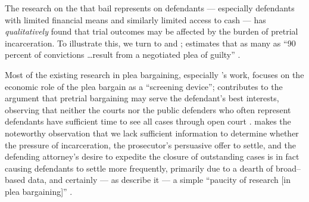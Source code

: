 The research on the  that bail represents on defendants
--- especially defendants with limited financial means and similarly limited access to cash ---
has \textit{qualitatively} found that
trial outcomes may be affected by the burden of pretrial incarceration.
To illustrate this, we turn to
\citet{grossman1983plea} and \citet{alschuler1981changing};
\citeauthor{grossman1983plea} estimates that as many as
``90 percent of convictions \dots result from a negotiated plea of guilty''
\citep[see also][with similar findings]{mccoy1980plea,kaplan1977american,newman1966conviction}.

Most of the existing research in plea bargaining,
especially \citeauthor{grossman1983plea}'s work,
focuses on the economic role of the plea bargain as a
``screening device'';
\citeauthor{alschuler1981changing}
contributes to the argument that pretrial bargaining may serve the defendant's best interests,
observing that neither the courts nor the public defenders who often represent defendants
have sufficient time to see all cases through open court
\citep{alschuler1981changing}.
\citeauthor{alschuler1981changing}
makes the noteworthy observation that we lack sufficient information to determine whether 
  the pressure of incarceration,
  the prosecutor's persuasive offer to settle, and
  the defending attorney's desire to expedite the closure of outstanding cases
is in fact causing defendants to settle more frequently,
primarily due to a dearth of broad--based data, and certainly
--- as \citeauthor{kellough2002remand} describe it ---
a simple ``paucity of research [in plea bargaining]''
\citep{kellough2002remand}.



